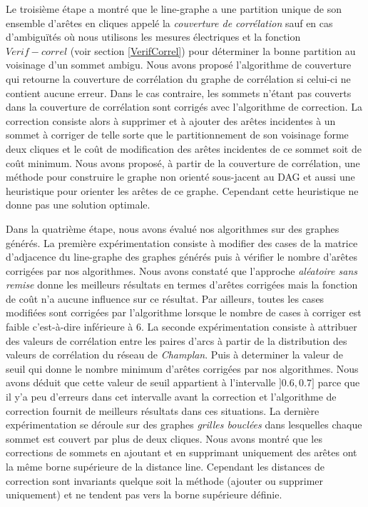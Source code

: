 Le troisi\`eme \'etape a montr\'e que le line-graphe a une partition unique de son ensemble d'ar\^etes en cliques appel\'e la {\em couverture de corr\'elation} sauf en cas d'ambigu\"{i}t\'es o\`u nous utilisons les mesures \'electriques et la fonction $Verif-correl$ (voir section \ref{VerifCorrel}) pour d\'eterminer la bonne partition au voisinage d'un sommet ambigu. 
Nous avons propos\'e  l'algorithme de couverture qui retourne la couverture de corr\'elation du graphe de corr\'elation si celui-ci ne contient aucune erreur. 
Dans le cas contraire, les sommets n'\'etant pas couverts dans la couverture de corr\'elation sont corrig\'es avec l'algorithme de correction. La correction consiste alors \`a supprimer et \`a ajouter des ar\^etes incidentes \`a un sommet \`a corriger de telle sorte que le partitionnement de son voisinage forme deux cliques et le co\^ut de modification des ar\^etes incidentes de ce sommet soit de co\^ut minimum. 
Nous avons propos\'e, \`a partir de la couverture de corr\'elation, une m\'ethode pour construire le graphe non orient\'e  sous-jacent au DAG et aussi une heuristique pour orienter les ar\^etes de ce graphe. Cependant cette heuristique ne donne pas une solution optimale.
\newline

Dans la quatri\`eme \'etape, nous avons \'evalu\'e nos algorithmes sur des graphes g\'en\'er\'es. 
La premi\`ere exp\'erimentation consiste \`a modifier des cases de la matrice d'adjacence du line-graphe des graphes g\'en\'er\'es puis \`a v\'erifier le nombre d'ar\^etes corrig\'ees par nos algorithmes.  
Nous avons constat\'e que l'approche {\em al\'eatoire sans remise} donne les meilleurs r\'esultats en termes d'ar\^etes corrig\'ees mais la fonction de co\^ut n'a aucune influence sur ce r\'esultat. 
Par ailleurs, toutes les cases modifi\'ees sont corrig\'ees par l'algorithme lorsque le nombre de cases \`a corriger est faible c'est-\`a-dire inf\'erieure \`a $6$. 
La seconde exp\'erimentation consiste \`a attribuer des valeurs de corr\'elation entre les paires d'arcs \`a partir de la distribution des valeurs de corr\'elation du r\'eseau de {\em Champlan}. 
Puis \`a determiner la valeur de seuil qui donne le nombre minimum d'ar\^etes corrig\'ees par nos algorithmes. 
Nous avons d\'eduit que cette valeur de seuil appartient \`a l'intervalle $]0.6,0.7]$ parce que il y'a peu d'erreurs dans cet intervalle avant la correction et l'algorithme de correction fournit de meilleurs r\'esultats dans ces situations.     
La derni\`ere exp\'erimentation se d\'eroule sur des graphes {\em grilles boucl\'ees} dans lesquelles chaque sommet est couvert par plus de deux cliques. Nous avons  montr\'e que les corrections de sommets en ajoutant et en supprimant uniquement des ar\^etes ont la m\^eme borne sup\'erieure de la distance line. Cependant les distances de correction sont invariants quelque soit la m\'ethode (ajouter ou supprimer uniquement)  et ne tendent pas vers la borne sup\'erieure d\'efinie.
\newline

